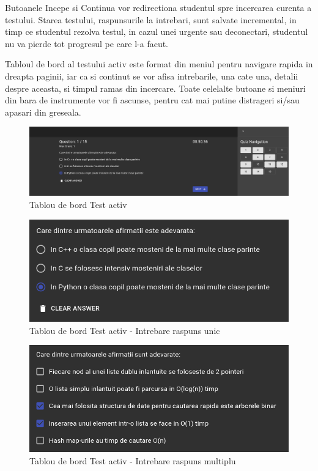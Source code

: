 \documentclass[12pt, a4paper, oneside, romanian]{teza-upb}
\begin{document}
Butoanele Incepe si Continua vor redirectiona studentul spre incercarea curenta a testului. Starea testului, raspunsurile la intrebari, sunt salvate incremental, in timp ce studentul rezolva testul, in cazul unei urgente sau deconectari, studentul nu va pierde tot progresul pe care l-a facut.

Tabloul de bord al testului activ este format din meniul pentru navigare rapida in dreapta paginii, iar ca si continut se vor afisa intrebarile, una cate una, detalii despre aceasta, si timpul ramas din incercare. Toate celelalte butoane si meniuri din bara de instrumente vor fi ascunse, pentru cat mai putine distrageri si/sau apasari din greseala.

\begin{figure}[H]
\centering
\includegraphics*[width=\columnwidth]{tablou-de-bord-test-activ}
\caption{Tablou de bord Test activ}
\label{tablou-de-bord-test-activ}
\end{figure}

\begin{figure}[H]
\centering
\includegraphics*[width=0.7\columnwidth]{tablou-de-bord-test-activ-intrebare-raspuns-unic}
\caption{Tablou de bord Test activ - Intrebare raspuns unic}
\label{tablou-de-bord-test-activ-intrebare-raspuns-unic}
\end{figure}

\begin{figure}[H]
\centering
\includegraphics*[width=0.7\columnwidth]{tablou-de-bord-test-activ-intrebare-raspuns-multiplu}
\caption{Tablou de bord Test activ - Intrebare raspuns multiplu}
\label{tablou-de-bord-test-activ-intrebare-raspuns-multiplu}
\end{figure}
\end{document}
